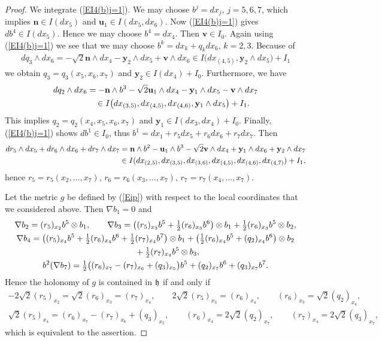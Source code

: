 \documentclass[11pt]{article}
\numberwithin{equation}{section}
\newcommand\fh{{\frak h}}
\newcommand\bu{{\mathbf u}}
\newcommand\by{{\mathbf y}}
\newcommand\bn{{\mathbf n}}
\newcommand\bv{{\mathbf v}}
\begin{document}
\begin{proof} We integrate (\ref{EI4(b)j=1}). We may choose $b^j=dx_j$, $j=5,6,7$, which implies $\bn\in I(dx_5)$ and $\bu_1\in I(dx_5, dx_6)$. Now (\ref{EI4(b)j=1}) gives $db^4\in I(dx_5)$. Hence we may choose $b^4=dx_4$. Then $\bv\in I_0$. Again using (\ref{EI4(b)j=1}) we see that we may choose $b^k=dx_k+q_k dx_6$, $k=2,3$. Because of
\begin{gather*} dq_3\wedge dx_6=-\sqrt 2 \bn\wedge dx_4 -\by_2\wedge dx_5 +\bv\wedge dx_6\in I\big(dx_{(4,5)}, \by_2\wedge dx_5\big) +I_1\end{gather*}
we obtain $q_3=q_3(x_5,x_6,x_7)$ and $\by_2\in I(dx_4)+I_0$. Furthermore, we have
\begin{gather*}
 dq_2\wedge dx_6 =-\bn\wedge b^3-\sqrt 2 \bu_1\wedge dx_4 -\by_1\wedge dx_5 -\bv\wedge dx_7\\
\hphantom{dq_2\wedge dx_6}{} \in I\big(dx_{(3,5)},dx_{(4,5)},dx_{(4,6)}, \by_1\wedge dx_5\big) +I_1.
 \end{gather*}
This implies $q_2=q_2(x_4,x_5,x_6,x_7)$ and $\by_1\in I(dx_3,dx_4)+I_0$. Finally, (\ref{EI4(b)j=1}) shows $db^1\in I_0$, thus $b^1= dx_1 + r_5dx_5+r_6dx_6+r_7dx_7$. Then
\begin{gather*}
dr_5\wedge dx_5+dr_6\wedge dx_6+dr_7\wedge dx_7 = \bn\wedge b^2 -\bu_1\wedge b^3 - \sqrt 2 \bv\wedge dx_4+\by_1\wedge dx_6+\by_2\wedge dx_7\\
\hphantom{dr_5\wedge dx_5+dr_6\wedge dx_6+dr_7\wedge dx_7}{} \in I(dx_{(2,5)}, dx_{(3,5)}, dx_{(3,6)}, dx_{(4,5)}, dx_{(4,6)}, dx_{(4,7)}) +I_1,
\end{gather*}
hence $r_5=r_5(x_2,\dots, x_7)$, $r_6=r_6(x_3,\dots,x_7)$, $r_7=r_7(x_4,\dots,x_7)$.

Let the metric $g$ be defined by (\ref{Eip}) with respect to the local coordinates that we considered above. Then $\nabla b_1=0$ and
\begin{gather*}
\nabla b_2 = (r_5)_{x_2} b^5\otimes b_1,\qquad
\nabla b_3 = \big((r_5)_{x_3}b^5+\tfrac12 (r_6)_{x_3}b^6\big)\otimes b_1+\tfrac12 (r_6)_{x_3}b^5\otimes b_2,\\
\nabla b_4 = \big( (r_5)_{x_4}b^5+ \tfrac12 (r_6)_{x_4}b^6+\tfrac12 (r_7)_{x_4}b^7\big)\otimes b_1 + \big(\tfrac12 (r_6)_{x_4}b^5+(q_2)_{x_4} b^6\big)\otimes b_2\\
\hphantom{\nabla b_4 =}{} + \tfrac12 (r_7)_{x_4} b^5\otimes b_3,\\
b^2(\nabla b_7) = \tfrac12 \big( (r_6)_{x_7}-(r_7)_{x_6}+(q_3)_{x_5} \big)b^5+ (q_2)_{x_7}b^6 +(q_3)_{x_7}b^7.
\end{gather*}
Hence the holonomy of $g$ is contained in $\fh$ if and only if
\begin{gather*}
-2\sqrt2(r_5)_{x_2} =\sqrt2(r_6)_{x_3}=(r_7)_{x_4}, \qquad
{2\sqrt2}(r_5)_{x_3} =(r_6)_{x_4},\qquad (r_6)_{x_3}= {\sqrt2}(q_2)_{x_4}, \\
\sqrt2 (r_5)_{x_4} = (r_6)_{x_7}-(r_7)_{x_6}+(q_3)_{x_5},\qquad (r_6)_{x_4}=2\sqrt2 (q_2)_{x_7},\qquad (r_7)_{x_4}=2\sqrt2 (q_3)_{x_7},
\end{gather*}
which is equivalent to the assertion.
\end{proof}
\end{document}
